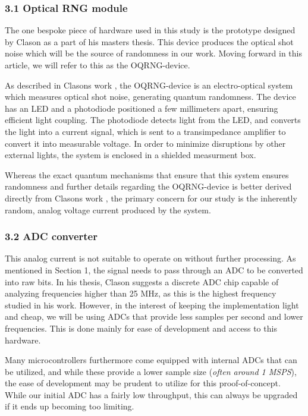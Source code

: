 \documentclass{sigchi}
\begin{document}
\subsubsection{3.1 Optical RNG module}\label{optical-rng-module}

The one bespoke piece of hardware used in this study is the prototype designed by Clason \cite{Clason2023} as a part of his masters thesis. This device produces the optical shot noise which will be the source of randomness in our work. Moving forward in this article, we will refer to this as the OQRNG-device.

As described in Clasons work \cite{Clason2023}, the OQRNG-device is an electro-optical system which measures optical shot noise, generating quantum randomness. The device has an LED and a photodiode positioned a few millimeters apart, ensuring efficient light coupling. The photodiode detects light from the LED, and converts the light into a current signal, which is sent to a transimpedance amplifier to convert it into measurable voltage. In order to minimize disruptions by other external lights, the system is enclosed in a shielded measurment box.

Whereas the exact quantum mechanisms that ensure that this system ensures randomness and further details regarding the OQRNG-device is better derived directly from Clasons work \cite{Clason2023}, the primary concern for our study is the inherently random, analog voltage current produced by the system.

\subsubsection{3.2 ADC converter}\label{adc-converter}

This analog current is not suitable to operate on without further processing. As mentioned in Section 1, the signal needs to pass through an ADC to be converted into raw bits. In his thesis, Clason \cite{Clason2023} suggests a discrete ADC chip capable of analyzing frequencies higher than 25 MHz, as this is the highest frequency studied in his work. However, in the interest of keeping the implementation light and cheap, we will be using ADCs that provide less samples per second and lower frequencies. This is done mainly for ease of development and access to this hardware.

Many microcontrollers furthermore come equipped with internal ADCs that can be utilized, and while these provide a lower sample size (\emph{often around 1 MSPS}), the ease of development may be prudent to utilize for this proof-of-concept. While our initial ADC has a fairly low throughput, this can always be upgraded if it ends up becoming too limiting.
\end{document}
